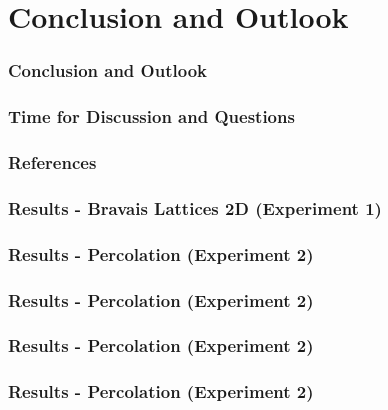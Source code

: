 \documentclass{beamer}
\begin{document}
\section{Conclusion and Outlook}
\begin{frame}
    \frametitle{Conclusion and Outlook}
    
\end{frame}

\begin{frame}
    \frametitle{Time for Discussion and Questions}
    
\end{frame}
\begin{frame}
    \frametitle{References}
    \printbibliography
\end{frame}

\begin{frame}
    \frametitle{Results - Bravais Lattices 2D (Experiment 1)}
    
\end{frame}
\begin{frame}
    \frametitle{Results - Percolation (Experiment 2)}
    
\end{frame}
\begin{frame}
    \frametitle{Results - Percolation (Experiment 2)}
    
\end{frame}
\begin{frame}
    \frametitle{Results - Percolation (Experiment 2)}
    
\end{frame}
\begin{frame}
    \frametitle{Results - Percolation (Experiment 2)}
    
\end{frame}
\end{document}
